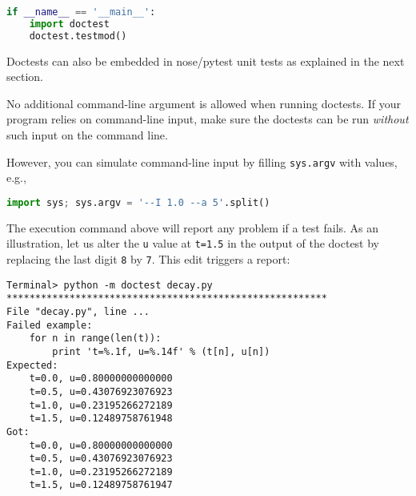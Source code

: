 \documentclass[graybox,sectrefs,envcountresetchap,open=right,final]{svmonodo}
\newenvironment{warning_mdfboxadmon}[1][]{
\begin{warning_mdfboxmdframed}[frametitle=#1]
}
{
\end{warning_mdfboxmdframed}
}
\begin{document}
\begin{lstlisting}[language=python,style=blue1_bluegreen]
if __name__ == '__main__':
    import doctest
    doctest.testmod()

\end{lstlisting}

Doctests can also be embedded in nose/pytest unit tests
as explained in the next section.


\begin{warning_mdfboxadmon}
No additional command-line argument is allowed when running doctests.
If your program relies on command-line input, make sure the doctests
can be run \emph{without} such input on the command line.

However, you can simulate command-line input by filling \texttt{sys.argv}
with values, e.g.,



\begin{lstlisting}[language=python,style=blue1_bluegreen]
import sys; sys.argv = '--I 1.0 --a 5'.split()

\end{lstlisting}
\end{warning_mdfboxadmon} %



The execution command above will report any problem if a test fails.
As an illustration, let us alter the \texttt{u} value at \texttt{t=1.5} in
the output of the doctest by replacing the last digit \texttt{8} by \texttt{7}.
This edit triggers a report:


















\begin{Verbatim}[frame=lines,label=\fbox{{\tiny Terminal}},framesep=2.5mm,framerule=0.7pt,fontsize=\fontsize{9pt}{9pt}]
Terminal> python -m doctest decay.py
********************************************************
File "decay.py", line ...
Failed example:
    for n in range(len(t)):
        print 't=%.1f, u=%.14f' % (t[n], u[n])
Expected:
    t=0.0, u=0.80000000000000
    t=0.5, u=0.43076923076923
    t=1.0, u=0.23195266272189
    t=1.5, u=0.12489758761948
Got:
    t=0.0, u=0.80000000000000
    t=0.5, u=0.43076923076923
    t=1.0, u=0.23195266272189
    t=1.5, u=0.12489758761947

\end{Verbatim}
\end{document}

